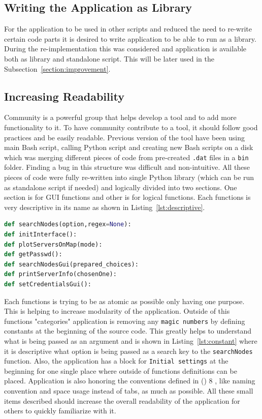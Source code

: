 \subsection{Writing the Application as Library}
For the application to be used in other scripts and reduced the need to re-write certain code parts it is desired to write application to be able to run as a library. During the re-implementation this was considered and application is available both as library and standalone script. This will be later used in the Subsection~\ref{section:improvement}.
\subsection{Increasing Readability}
\label{subsection:readability}
Community is a powerful group that helps develop a tool and to add more functionality to it. To have community contribute to a tool, it should follow good practices and be easily readable. Previous version of the tool have been using main Bash script, calling Python script and creating new Bash scripts on a disk which was merging different pieces of code from pre-created \texttt{.dat} files in a \texttt{bin} folder. Finding a bug in this structure was difficult and non-intuitive. All these pieces of code were fully re-written into single Python library (which can be run as standalone script if needed) and logically divided into two sections. One section is for GUI functions and other is for logical functions. Each functions is very descriptive in its name as shown in Listing~\ref{lst:descriptive}. 

\begin{minipage}{\linewidth}
\begin{lstlisting}[language=Python, numbers=none, label={lst:descriptive}, caption=Example of Function Names, frame=single, showstringspaces=false, breaklines=true]
def searchNodes(option,regex=None):
def initInterface():
def plotServersOnMap(mode):
def getPasswd():
def searchNodesGui(prepared_choices):
def printServerInfo(chosenOne):
def setCredentialsGui():
\end{lstlisting}
\end{minipage}

Each functions is trying to be as atomic as possible only having one purpose. This is helping to increase modularity of the application. Outside of this functions "categories" application is removing any \texttt{magic numbers} by defining constants at the beginning of the source code. This greatly helps to understand what is being passed as an argument and is shown in Listing~\ref{lst:constant} where it is descriptive what option is being passed as a search key to the \texttt{searchNodes} function. Also, the application has a block for \texttt{Initial settings} at the beginning for one single place where outside of functions definitions can be placed. Application is also honoring the conventions defined in  () 8 \cite{pythonpep}, like naming convention and space usage instead of tabs, as much as possible. All these small items described should increase the overall readability of the application for others to quickly familiarize with it.

